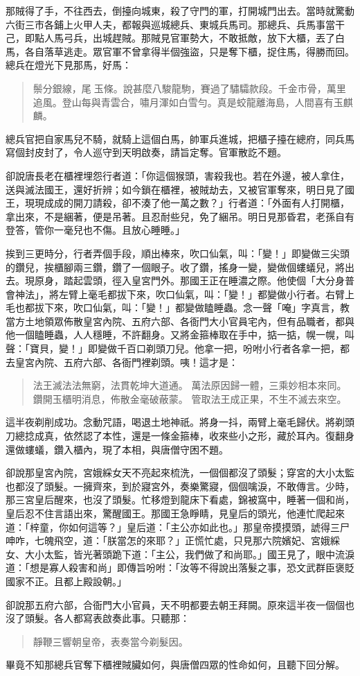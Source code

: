 那賊得了手，不往西去，倒擡向城東，殺了守門的軍，打開城門出去。當時就驚動六街三市各鋪上火甲人夫，都報與巡城總兵、東城兵馬司。那總兵、兵馬事當干己，即點人馬弓兵，出城趕賊。那賊見官軍勢大，不敢抵敵，放下大櫃，丟了白馬，各自落草逃走。眾官軍不曾拿得半個強盜，只是奪下櫃，捉住馬，得勝而回。總兵在燈光下見那馬，好馬：
\begin{quote}
鬃分銀線，尾𢷑玉條。說甚麼八駿龍駒，賽過了驌驦款段。千金市骨，萬里追風。登山每與青雲合，嘯月渾如白雪勻。真是蛟龍離海島，人間喜有玉麒麟。
\end{quote}

總兵官把自家馬兒不騎，就騎上這個白馬，帥軍兵進城，把櫃子擡在總府，同兵馬寫個封皮封了，令人巡守到天明啟奏，請旨定奪。官軍散訖不題。

卻說唐長老在櫃裡埋怨行者道：「你這個猴頭，害殺我也。若在外邊，被人拿住，送與滅法國王，還好折辨；如今鎖在櫃裡，被賊劫去，又被官軍奪來，明日見了國王，現現成成的開刀請殺，卻不湊了他一萬之數？」行者道：「外面有人打開櫃，拿出來，不是綑著，便是吊著。且忍耐些兒，免了綑吊。明日見那昏君，老孫自有登答，管你一毫兒也不傷。且放心睡睡。」

挨到三更時分，行者弄個手段，順出棒來，吹口仙氣，叫：「變！」即變做三尖頭的鑽兒，挨櫃腳兩三鑽，鑽了一個眼子。收了鑽，搖身一變，變做個螻蟻兒，將出去。現原身，踏起雲頭，徑入皇宮門外。那國王正在睡濃之際。他使個「大分身普會神法」，將左臂上毫毛都拔下來，吹口仙氣，叫：「變！」都變做小行者。右臂上毛也都拔下來，吹口仙氣，叫：「變！」都變做瞌睡蟲。念一聲「唵」字真言，教當方土地領眾佈散皇宮內院、五府六部、各衙門大小官員宅內，但有品職者，都與他一個瞌睡蟲，人人穩睡，不許翻身。又將金箍棒取在手中，掂一掂，幌一幌，叫聲：「寶貝，變！」即變做千百口剃頭刀兒。他拿一把，吩咐小行者各拿一把，都去皇宮內院、五府六部、各衙門裡剃頭。咦！這才是：
\begin{quote}
法王滅法法無窮，法貫乾坤大道通。
萬法原因歸一體，三乘妙相本來同。
鑽開玉櫃明消息，佈散金毫破蔽蒙。
管取法王成正果，不生不滅去來空。
\end{quote}

這半夜剃削成功。念動咒語，喝退土地神祇。將身一抖，兩臂上毫毛歸伏。將剃頭刀總捻成真，依然認了本性，還是一條金箍棒，收來些小之形，藏於耳內。復翻身還做螻蟻，鑽入櫃內，現了本相，與唐僧守困不題。

卻說那皇宮內院，宮娥綵女天不亮起來梳洗，一個個都沒了頭髮；穿宮的大小太監也都沒了頭髮。一擁齊來，到於寢宮外，奏樂驚寢，個個噙淚，不敢傳言。少時，那三宮皇后醒來，也沒了頭髮。忙移燈到龍床下看處，錦被窩中，睡著一個和尚，皇后忍不住言語出來，驚醒國王。那國王急睜睛，見皇后的頭光，他連忙爬起來道：「梓童，你如何這等？」皇后道：「主公亦如此也。」那皇帝摸摸頭，諕得三尸呻咋，七魄飛空，道：「朕當怎的來耶？」正慌忙處，只見那六院嬪妃、宮娥綵女、大小太監，皆光著頭跪下道：「主公，我們做了和尚耶。」國王見了，眼中流淚道：「想是寡人殺害和尚」即傳旨吩咐：「汝等不得說出落髮之事，恐文武群臣褒貶國家不正。且都上殿設朝。」

卻說那五府六部，合衙門大小官員，天不明都要去朝王拜闕。原來這半夜一個個也沒了頭髮。各人都寫表啟奏此事。只聽那：
\begin{quote}
靜鞭三響朝皇帝，表奏當今剃髮因。
\end{quote}

畢竟不知那總兵官奪下櫃裡賊臟如何，與唐僧四眾的性命如何，且聽下回分解。
